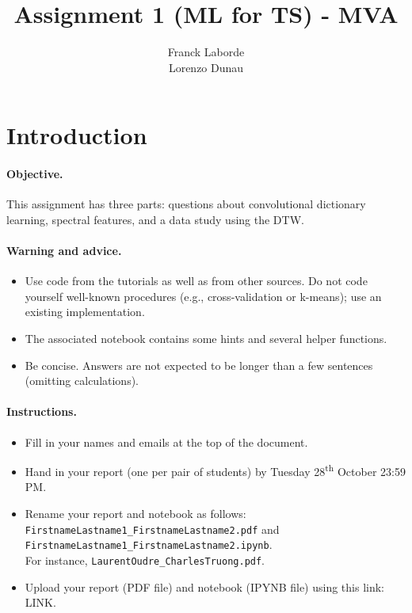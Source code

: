 \documentclass[11pt]{article}
\title{Assignment 1 (ML for TS) - MVA}
\author{
Franck Laborde \email{f.laborde6540@gmail.com} \\ %
Lorenzo Dunau \email{lorenzo.dunau@gmail.com} %
}
\begin{document}
\maketitle

\section{Introduction}

\paragraph{Objective.} This assignment has three parts: questions about convolutional dictionary learning, spectral features, and a data study using the DTW. 

\paragraph{Warning and advice.} 
\begin{itemize}
    \item Use code from the tutorials as well as from other sources. Do not code yourself well-known procedures (e.g., cross-validation or k-means); use an existing implementation. 
    \item The associated notebook contains some hints and several helper functions.
    \item Be concise. Answers are not expected to be longer than a few sentences (omitting calculations).
\end{itemize}



\paragraph{Instructions.}
\begin{itemize}
    \item Fill in your names and emails at the top of the document.
    \item Hand in your report (one per pair of students) by Tuesday 28\textsuperscript{th} October 23:59 PM.
    \item Rename your report and notebook as follows:\\ \texttt{FirstnameLastname1\_FirstnameLastname2.pdf} and\\ \texttt{FirstnameLastname1\_FirstnameLastname2.ipynb}.\\
    For instance, \texttt{LaurentOudre\_CharlesTruong.pdf}.
    \item Upload your report (PDF file) and notebook (IPYNB file) using this link: \footnotesize{LINK}.
\end{itemize}
\end{document}

